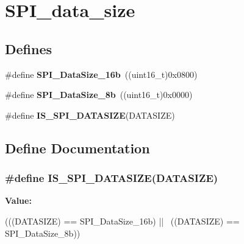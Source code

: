 \hypertarget{group__SPI__data__size}{
\section{SPI\_\-data\_\-size}
\label{group__SPI__data__size}
}
\subsection*{Defines}
\begin{DoxyCompactItemize}
\item 
\hypertarget{group__SPI__data__size_ga8af2c8ca5c2162423531ebf560e0a41d}{
\#define {\bfseries SPI\_\-DataSize\_\-16b}~((uint16\_\-t)0x0800)}
\label{group__SPI__data__size_ga8af2c8ca5c2162423531ebf560e0a41d}

\item 
\hypertarget{group__SPI__data__size_ga56721814a935922b6ca7c49060509765}{
\#define {\bfseries SPI\_\-DataSize\_\-8b}~((uint16\_\-t)0x0000)}
\label{group__SPI__data__size_ga56721814a935922b6ca7c49060509765}

\item 
\#define {\bfseries IS\_\-SPI\_\-DATASIZE}(DATASIZE)
\end{DoxyCompactItemize}


\subsection{Define Documentation}
\hypertarget{group__SPI__data__size_gab6f9f528f7eb70373b9caf3548e44e67}{
\subsubsection[{IS\_\-SPI\_\-DATASIZE}]{\setlength{\rightskip}{0pt plus 5cm}\#define IS\_\-SPI\_\-DATASIZE(DATASIZE)}}
\label{group__SPI__data__size_gab6f9f528f7eb70373b9caf3548e44e67}
{\bfseries Value:}
\begin{DoxyCode}
(((DATASIZE) == SPI_DataSize_16b) || \
                                   ((DATASIZE) == SPI_DataSize_8b))
\end{DoxyCode}
